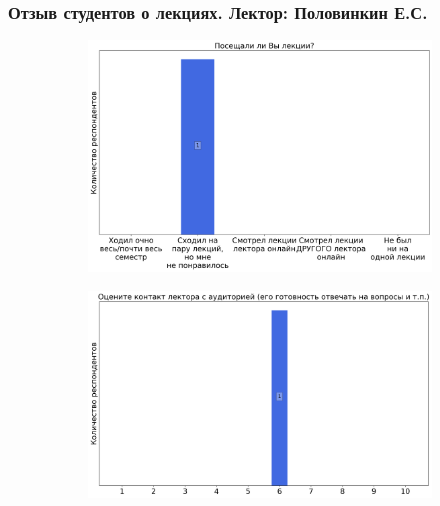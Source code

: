     \subsubsection{Отзыв студентов о лекциях. Лектор: Половинкин Е.С.}
        \begin{figure}[H]
            \centering
            \begin{subfigure}[b]{0.45\textwidth}
                \centering
                \includegraphics[width=\textwidth]{images/3 course/ТФКП/lecturer-questions-Половинкин Е.С.-0.png}
            \end{subfigure}
            \begin{subfigure}[b]{0.45\textwidth}
                \centering
                \includegraphics[width=\textwidth]{images/3 course/ТФКП/lecturer-marks-Половинкин Е.С.-0.png}
            \end{subfigure}
            \begin{subfigure}[b]{0.45\textwidth}

\end{subfigure}
\end{figure}
